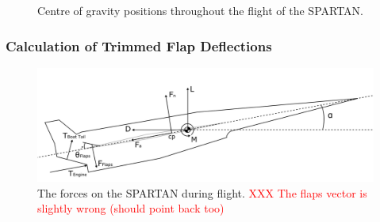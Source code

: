 \begin{figure}
\begin{subfigure}{.5\textwidth}
			\end{subfigure}
			\caption{Centre of gravity positions throughout the flight of the SPARTAN. }%
			\label{fig:CentreOfGravity}
		\end{figure}
		
		
		\subsubsection{Calculation of Trimmed Flap Deflections}\label{sec:trim}
		
		
		\begin{figure}[ht]
			\centering
			\includegraphics[width=0.7\linewidth]{figures/3_vehicle_design/SPARTANForces}
			\caption{The forces on the SPARTAN during flight. \textcolor{red}{XXX The flaps vector is slightly wrong (should point back too)}}
			\label{fig:SPARTANForces}
		\end{figure}
		
